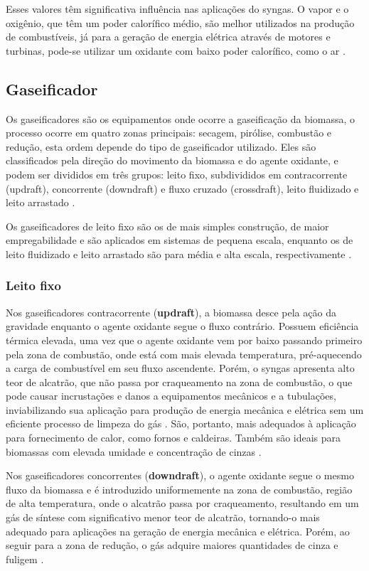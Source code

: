 Esses valores têm significativa influência nas aplicações do syngas. O vapor e o oxigênio, que têm um poder calorífico médio, são melhor utilizados na produção de combustíveis, já para a geração de energia elétrica através de motores e turbinas, pode-se utilizar um oxidante com baixo poder calorífico, como o ar \cite{bridgwater2003}.

\subsection{Gaseificador}

Os gaseificadores são os equipamentos onde ocorre a gaseificação da biomassa, o processo ocorre em quatro zonas principais: secagem, pirólise, combustão e redução, esta ordem depende do tipo de gaseificador utilizado. Eles são classificados pela direção do movimento da biomassa e do agente oxidante, e podem ser divididos em três grupos: leito fixo, subdivididos em contracorrente (updraft), concorrente (downdraft) e fluxo cruzado (crossdraft), leito fluidizado e leito arrastado \cite{higman2007}.
 
Os gaseificadores de leito fixo são os de mais simples construção, de maior empregabilidade e são aplicados em sistemas de pequena escala, enquanto os de leito fluidizado e leito arrastado são para média e alta escala, respectivamente \cite{basu2010}. 

\subsubsection{Leito fixo}

Nos gaseificadores contracorrente (\textbf{updraft}), a biomassa desce pela ação da gravidade enquanto o agente oxidante segue o fluxo contrário. Possuem eficiência térmica elevada, uma vez que o agente oxidante vem por baixo passando primeiro pela zona de combustão, onde está com mais elevada temperatura, pré-aquecendo a carga de combustível em seu fluxo ascendente. Porém, o syngas apresenta alto teor de alcatrão, que não passa por craqueamento na zona de combustão, o que pode causar incrustações e danos a equipamentos  mecânicos e a tubulações, inviabilizando sua aplicação para produção de energia mecânica e elétrica sem um eficiente processo de limpeza do gás \cite{sanchez2010}. São, portanto, mais adequados à aplicação para fornecimento de calor, como fornos e caldeiras. Também são ideais para biomassas com elevada umidade e concentração de cinzas \cite{basu2010}.

Nos gaseificadores concorrentes (\textbf{downdraft}), o agente oxidante segue o mesmo fluxo da biomassa e é introduzido uniformemente na zona de combustão, região de alta temperatura, onde o alcatrão passa por craqueamento, resultando em um gás de síntese com significativo menor teor de alcatrão, tornando-o mais adequado para aplicações na geração de energia mecânica e elétrica. Porém, ao seguir para a zona de redução, o gás adquire maiores quantidades de cinza e fuligem \cite{sanchez2010}. 

